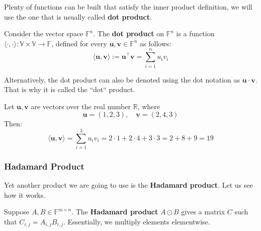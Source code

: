 \documentclass[../lecture-notes.tex]{subfiles}
\begin{document}
Plenty of functions can be built that satisfy the inner product definition, we will use the one that
is usually called \textbf{dot product}.
\begin{definition}
    Consider the vector space $\mathbb{F}^n$. The \textbf{dot product} on $\mathbb{F}^n$ is a function $\langle \cdot, \cdot \rangle: \mathbb{V} \times \mathbb{V} \rightarrow \mathbb{F}$, 
    defined for every $\mathbf{u}, \mathbf{v} \in \mathbb{F}^n$ as follows:
    \begin{equation*}
        \langle \mathbf{u}, \mathbf{v} \rangle := \mathbf{u}^{\top}\mathbf{v} = \sum_{i=1}^{n} u_i v_i
    \end{equation*}

    Alternatively, the dot product can also be denoted using the dot notation as $\mathbf{u} \cdot \mathbf{v}$. That is why it is called the ``dot`` product.
\end{definition}

\begin{example}
    Let $\mathbf{u}, \mathbf{v}$ are vectors over the real number $\mathbb{R}$, where
    \begin{equation*}
        \mathbf{u} = (1, 2, 3), \quad \mathbf{v} = (2, 4, 3)
    \end{equation*}
    Then: 
    \begin{equation*}
        \langle \mathbf{u}, \mathbf{v}\rangle = \sum_{i=1}^{3}u_iv_i = 2 \cdot 1 + 2 \cdot 4 + 3 \cdot 3 = 2 + 8 + 9 = 19
    \end{equation*}
\end{example}

\subsubsection{Hadamard Product}

Yet another product we are going to use is the \textbf{Hadamard product}. Let us see how it works.
\begin{definition}
    Suppose $A,B \in \mathbb{F}^{m \times n}$. The \textbf{Hadamard product} $A \odot B$ gives a matrix $C$ such that $C_{i,j} = A_{i,j}B_{i,j}$. Essentially, we multiply elements elementwise.
\end{definition}
\end{document}
